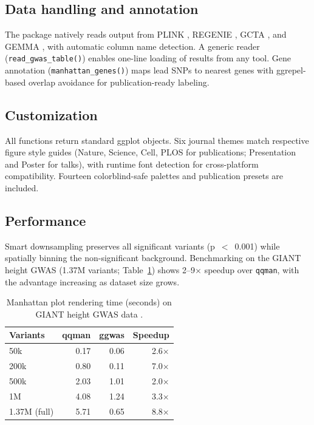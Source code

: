 \documentclass{bioinfo}
\begin{document}
\subsection{Data handling and annotation}

The package natively reads output from PLINK \citep{purcell2007}, REGENIE \citep{mbatchou2021}, GCTA \citep{yang2011gcta}, and GEMMA \citep{zhou2012}, with automatic column name detection. A generic reader (\texttt{read\_gwas\_table()}) enables one-line loading of results from any tool. Gene annotation (\texttt{manhattan\_genes()}) maps lead SNPs to nearest genes with ggrepel-based overlap avoidance for publication-ready labeling.

\subsection{Customization}

All functions return standard ggplot objects. Six journal themes match respective figure style guides (Nature, Science, Cell, PLOS for publications; Presentation and Poster for talks), with runtime font detection for cross-platform compatibility. Fourteen colorblind-safe palettes and publication presets are included.

\subsection{Performance}

Smart downsampling preserves all significant variants (p~$<$~0.001) while spatially binning the non-significant background. Benchmarking on the GIANT height GWAS \citep{yengo2022} (1.37M variants; Table~\ref{tab:benchmark}) shows 2--9$\times$ speedup over \texttt{qqman}, with the advantage increasing as dataset size grows.

\begin{table}[h]
\centering
\caption{Manhattan plot rendering time (seconds) on GIANT height GWAS data \citep{yengo2022}.}\label{tab:benchmark}
\begin{tabular}{@{}lrrr@{}}
\toprule
Variants & qqman & ggwas & Speedup \\
\midrule
50k  & 0.17 & 0.06 & 2.6$\times$ \\
200k & 0.80 & 0.11 & 7.0$\times$ \\
500k & 2.03 & 1.01 & 2.0$\times$ \\
1M   & 4.08 & 1.24 & 3.3$\times$ \\
1.37M (full) & 5.71 & 0.65 & 8.8$\times$ \\
\bottomrule
\end{tabular}
\end{table}
\end{document}
